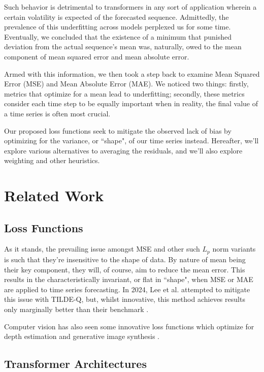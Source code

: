 \documentclass{article}
\begin{document}
Such behavior is detrimental to transformers in any sort of application wherein a certain volatility is expected of the forecasted sequence. Admittedly, the prevalence of this underfitting across models perplexed us for some time. Eventually, we concluded that the existence of a minimum that punished deviation from the actual sequence's mean was, naturally, owed to the mean component of mean squared error and mean absolute error.

Armed with this information, we then took a step back to examine Mean Squared Error (MSE) and Mean Absolute Error (MAE). We noticed two things: firstly, metrics that optimize for a mean lead to underfitting; secondly, these metrics consider each time step to be equally important when in reality, the final value of a time series is often most crucial.

Our proposed loss functions seek to mitigate the observed lack of bias by optimizing for the variance, or ``shape", of our time series instead. Hereafter, we'll explore various alternatives to averaging the residuals, and we'll also explore weighting and other heuristics.

\section{Related Work}

\subsection{Loss Functions}

As it stands, the prevailing issue amongst MSE and other such \( L_p \) norm variants is such that they're insensitive to the shape of data. By nature of mean being their key component, they will, of course, aim to reduce the mean error. This results in the characteristically invariant, or flat in ``shape", when MSE or MAE are applied to time series forecasting. In 2024, Lee et al. attempted to mitigate this issue with TILDE-Q, but, whilst innovative, this method achieves results only marginally better than their benchmark \cite{lee2024tildeq}.

Computer vision has also seen some innovative loss functions which optimize for depth estimation and generative image synthesis \cite{Barron_2019_CVPR}.

\subsection{Transformer Architectures}
\end{document}
